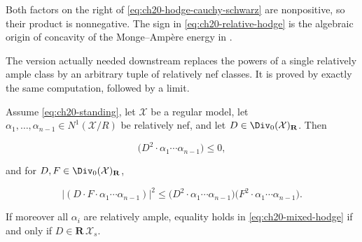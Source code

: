 Both factors on the right of \eqref{eq:ch20-hodge-cauchy-schwarz} are
nonpositive, so their product is nonnegative.  The sign in
\eqref{eq:ch20-relative-hodge} is the algebraic origin of concavity of the
Monge--Amp\`ere energy in .

The version actually needed downstream replaces the powers of a single
relatively ample class by an arbitrary tuple of relatively nef classes.  It
is proved by exactly the same computation, followed by a limit.

\begin{theorem}
\label{thm:ch20-mixed-hodge}
Assume \eqref{eq:ch20-standing}, let $\mathcal X$ be a regular model, let
$\alpha_1,\ldots,\alpha_{n-1}\in N^1(\mathcal X/R)$ be relatively nef, and
let $D\in\Div_0(\mathcal X)_{\mathbf R}$.  Then

\begin{equation}
\label{eq:ch20-mixed-hodge}
 \bigl(D^2\cdot\alpha_1\cdots\alpha_{n-1}\bigr)\leq0 ,
\end{equation}

and for $D,F\in\Div_0(\mathcal X)_{\mathbf R}$,

\begin{equation}
\label{eq:ch20-mixed-cauchy-schwarz}
 \bigl|(D\cdot F\cdot\alpha_1\cdots\alpha_{n-1})\bigr|^2
 \leq
 \bigl(D^2\cdot\alpha_1\cdots\alpha_{n-1}\bigr)
 \bigl(F^2\cdot\alpha_1\cdots\alpha_{n-1}\bigr).
\end{equation}

If moreover all $\alpha_i$ are relatively ample, equality holds in
\eqref{eq:ch20-mixed-hodge} if and only if $D\in\mathbf R\,\mathcal X_s$.
\end{theorem}

